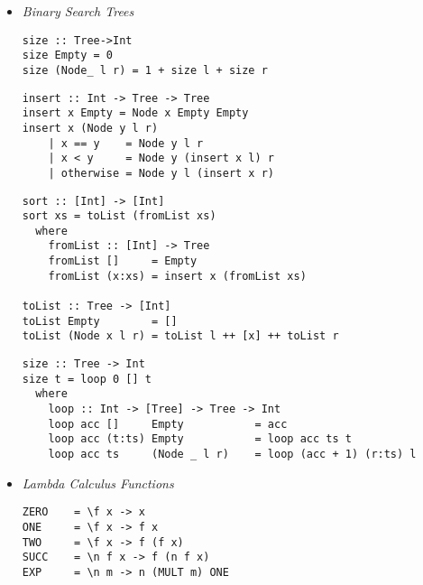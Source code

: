 \documentclass[landscape,8pt]{extarticle}
\begin{document}
\begin{multicols}{3}
\begin{itemize}
\begin{lstlisting}
digitsOfInt :: Int -> [Int]
digitsOfInt n
    | n < 0     = []
    | n < 10    = [n]
    | otherwise = digitsOfInt (div n 10) ++ [mod n 10]

digits :: Int -> [Int]
digits n = digitsOfInt (abs n)
\end{lstlisting}
\begin{lstlisting}
additivePersistence :: Int -> Int
additivePersistence n~
    | n < 10    = 0
    | otherwise = 1 + additivePersistence (sumList (digitsOfInt n))
\end{lstlisting}
\begin{lstlisting}
digitalRoot :: Int -> Int
digitalRoot n
    | n < 10    = n
    | otherwise = digitalRoot (sumList (digitsOfInt n))
\end{lstlisting}
\begin{lstlisting}
listReverse :: [a] -> [a]
listReverse []      = []
listReverse (x:xs)  = listReverse xs ++ [x]
\end{lstlisting}
\item \emph{Binary Search Trees}
\begin{lstlisting}
size :: Tree->Int
size Empty = 0
size (Node_ l r) = 1 + size l + size r
\end{lstlisting}
\begin{lstlisting}
insert :: Int -> Tree -> Tree
insert x Empty = Node x Empty Empty
insert x (Node y l r)
    | x == y    = Node y l r
    | x < y     = Node y (insert x l) r
    | otherwise = Node y l (insert x r)
\end{lstlisting}
\begin{lstlisting}
sort :: [Int] -> [Int]
sort xs = toList (fromList xs)
  where
    fromList :: [Int] -> Tree
    fromList []     = Empty
    fromList (x:xs) = insert x (fromList xs)

toList :: Tree -> [Int]
toList Empty        = []
toList (Node x l r) = toList l ++ [x] ++ toList r
\end{lstlisting}
\begin{lstlisting}
size :: Tree -> Int
size t = loop 0 [] t
  where
    loop :: Int -> [Tree] -> Tree -> Int
    loop acc []     Empty           = acc
    loop acc (t:ts) Empty           = loop acc ts t
    loop acc ts     (Node _ l r)    = loop (acc + 1) (r:ts) l
\end{lstlisting}

\item \emph{Lambda Calculus Functions}
            \begin{lstlisting}
ZERO    = \f x -> x
ONE     = \f x -> f x
TWO     = \f x -> f (f x)
SUCC    = \n f x -> f (n f x)
EXP     = \n m -> n (MULT m) ONE


\end{lstlisting}
\end{itemize}
\end{multicols}
\end{document}
